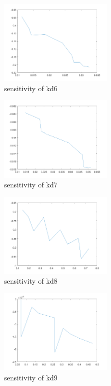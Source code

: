 	\begin{figure}[H]
		\begin{subfigure}{0.5\textwidth}
			\includegraphics[height=4cm]{d6.png}
			\caption{sensitivity of kd6}
		\end{subfigure}%
		\begin{subfigure}{0.5\textwidth}
			\includegraphics[height=4cm]{d7.png}
			\caption{sensitivity of kd7}
		\end{subfigure}
		\begin{subfigure}{0.5\textwidth}
			\includegraphics[height=4cm]{d8.png}
			\caption{sensitivity of kd8}
		\end{subfigure}%
		\begin{subfigure}{0.5\textwidth}
			\includegraphics[height=4cm]{d9.png}
			\caption{sensitivity of kd9}
		\end{subfigure}
		\begin{subfigure}{0.5\textwidth}

\end{subfigure}
\end{figure}
